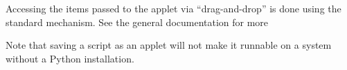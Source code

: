 Accessing the items passed to the applet via ``drag-and-drop'' is done
using the standard  mechanism. See the general
documentation for more

Note that saving a script as an applet will not make it runnable on a
system without a Python installation.

 
 

 
